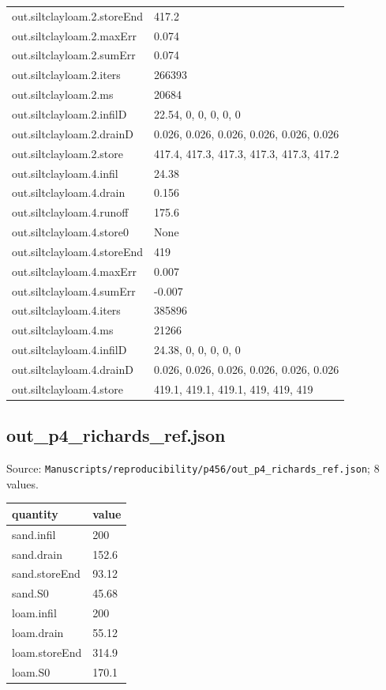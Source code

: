 {\begin{longtable}{p{}p{}}
{}out.siltclayloam.2.storeEnd & 417.2\\
{}out.siltclayloam.2.maxErr & 0.074\\
{}out.siltclayloam.2.sumErr & 0.074\\
{}out.siltclayloam.2.iters & 266393\\
{}out.siltclayloam.2.ms & 20684\\
{}out.siltclayloam.2.infilD & 22.54, 0, 0, 0, 0, 0\\
{}out.siltclayloam.2.drainD & 0.026, 0.026, 0.026, 0.026, 0.026, 0.026\\
{}out.siltclayloam.2.store & 417.4, 417.3, 417.3, 417.3, 417.3, 417.2\\
{}out.siltclayloam.4.infil & 24.38\\
{}out.siltclayloam.4.drain & 0.156\\
{}out.siltclayloam.4.runoff & 175.6\\
{}out.siltclayloam.4.store0 & None\\
{}out.siltclayloam.4.storeEnd & 419\\
{}out.siltclayloam.4.maxErr & 0.007\\
{}out.siltclayloam.4.sumErr & -0.007\\
{}out.siltclayloam.4.iters & 385896\\
{}out.siltclayloam.4.ms & 21266\\
{}out.siltclayloam.4.infilD & 24.38, 0, 0, 0, 0, 0\\
{}out.siltclayloam.4.drainD & 0.026, 0.026, 0.026, 0.026, 0.026, 0.026\\
{}out.siltclayloam.4.store & 419.1, 419.1, 419.1, 419, 419, 419\\
\bottomrule\end{longtable}}

\subsection*{out\_p4\_richards\_ref.json}
\noindent\small Source: \nolinkurl{Manuscripts/reproducibility/p456/out_p4_richards_ref.json}; 8 values.\par
{\scriptsize\begin{longtable}{p{}p{}}\toprule\textbf{quantity} & \textbf{value}\\\midrule\endhead
{}sand.infil & 200\\
{}sand.drain & 152.6\\
{}sand.storeEnd & 93.12\\
{}sand.S0 & 45.68\\
{}loam.infil & 200\\
{}loam.drain & 55.12\\
{}loam.storeEnd & 314.9\\
{}loam.S0 & 170.1\\
\bottomrule\end{longtable}}

